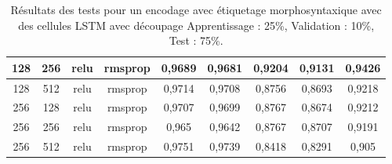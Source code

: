 \begin{table}[H]
{\begin{tabular}{|c|c|c|c|c|c|c|c|c|}
				128 & 256 & relu & rmsprop & 0,9689 & 0,9681 & 0,9204 & 0,9131 & 0,9426 \\ \hline
				128 & 512 & relu & rmsprop & 0,9714 & 0,9708 & 0,8756 & 0,8693 & 0,9218 \\ \hline
				256 & 128 & relu & rmsprop & 0,9707 & 0,9699 & 0,8767 & 0,8674 & 0,9212 \\ \hline
				256 & 256 & relu & rmsprop & 0,965 & 0,9642 & 0,8767 & 0,8707 & 0,9191 \\ \hline
				256 & 512 & relu & rmsprop & 0,9751 & 0,9739 & 0,8418 & 0,8291 & 0,905 \\ \hline
			\end{tabular}%
		}
		\caption{Résultats des tests pour un encodage avec étiquetage morphosyntaxique avec des cellules LSTM avec découpage Apprentissage : 25\%, Validation : 10\%, Test : 75\%.}
		\label{tab:lstm_1_postag}
	\end{table}
